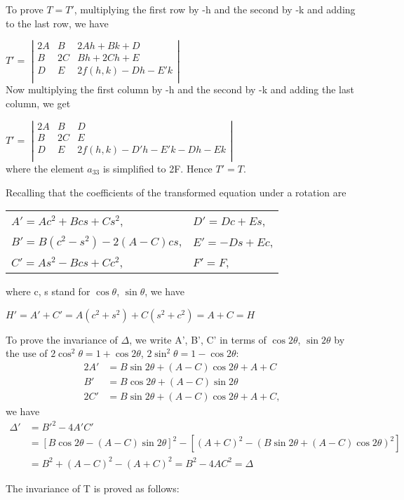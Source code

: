 \documentclass[12pt]{article}
\begin{document}
    \noindent To prove $T=T'$, multiplying the first row by -h and the second by -k and adding to the last row, we have
        
    \hspace{2.5cm}
    $
    T' = $
    $
    \left |
    \begin{array}{lll}
    2A & B & 2Ah + Bk + D\\
    B  & 2C & Bh + 2Ch + E \\
    D  & E & 2f(h, k)-D h-E'k \\
    \end{array}
    \right |
    $\\
    Now multiplying the first column by -h and the second by -k and adding the last column, we get
        
    \hspace{2.5cm}
    $T' = $
    $ 
    \left |
    \begin{array}{lll}
    2A & B & D\\
    B  & 2C & E \\
    D  & E & 2f(h, k)-D'h-E'k-Dh-Ek \\
    \end{array}
    \right |
    $ \\
    where the element $a_{33}$ is simplified to 2F. Hence $T' = T$. 
    
    Recalling that the coefficients of the transformed equation under a rotation are
    \begin{center}
        \begin{tabular}{ l l}
            $A' = Ac^2 + Bcs + Cs^2$,& $D' = Dc + Es$, \\
            $B' = B(c^2-s^2)-2(A-C)cs$, & $E' = -Ds + Ec$, \\
            $C' = As^2 - Bcs + Cc^2$, & $F' = F$, \\
        \end{tabular}
    \end{center}
    where c, s stand for $\cos\theta$, $\sin\theta$, we have
    \begin{center}
        $H' = A' + C' = A(c^2+s^2) + C(s^2+c^2) = A + C = H$
    \end{center}
    
    To prove the invariance of $\Delta$, we write A', B', C' in terms of $\cos2\theta$,  $\sin2\theta$ by the use of $2\cos^2\theta=1+\cos2\theta$, $2\sin^2\theta=1-\cos2\theta$:
    \begin{align*}
        2A' &= B\sin2\theta + (A-C)\cos2\theta + A + C\\
        B' &= B\cos2\theta + (A-C)\sin2\theta\\
        2C' &= B\sin2\theta + (A-C)\cos2\theta + A + C,
    \end{align*}
    we have 
    \begin{align*}
        \Delta'&=B'^2-4A'C'\\
        &=[B\cos2\theta-(A-C)\sin2\theta]^2-[(A+C)^2-(B\sin2\theta+(A-C)\cos2\theta)^2]\\
        &=B^2 + (A-C)^2-(A+C)^2 = B^2-4AC^2 = \Delta
    \end{align*}
    
    The invariance of T is proved as follows:
\end{document}
